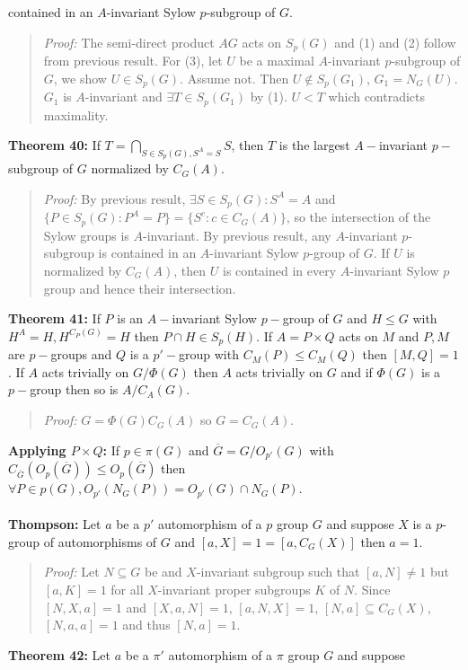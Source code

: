 contained in an $A$-invariant Sylow $p$-subgroup of $G$.
\begin{quote}
\emph{Proof:}  
The semi-direct product $AG$ acts on $S_p(G)$ and (1) and (2) follow from previous result.
For (3), let $U$ be a maximal $A$-invariant $p$-subgroup of $G$, we show $U \in S_p(G)$. 
Assume not.  Then $U \notin S_p(G_1)$, $G_1 = N_G(U)$.  $G_1$ is $A$-invariant and $\exists T \in S_p(G_1)$
by (1).  $U<T$ which contradicts maximality.
\end{quote}
{\bf Theorem 40:}
If $T=\bigcap_{S \in S_p(G), S^A=S} S$,
then $T$ is the largest $A-$invariant $p-$subgroup of $G$ normalized by $C_G(A)$.
\begin{quote}
\emph{Proof:}  
By previous result, $\exists S \in S_p(G): S^A=A$ and
$\{P \in S_p(G): P^A=P \} = \{S^c: c \in C_G(A) \}$, so the intersection of the Sylow groups is
$A$-invariant. By previous result, any $A$-invariant $p$-subgroup is contained in an $A$-invariant
Sylow $p$-group of $G$.  If $U$ is normalized by $C_G(A)$, then $U$ is contained in every $A$-invariant
Sylow $p$ group and hence their intersection.
\end{quote}
{\bf Theorem 41:}
If $P$ is an $A-$invariant Sylow $p-$group of $G$ and $H \le G$ with $H^A=H, H^{C_P(G)}=H$ then
$P \cap H \in S_p(H)$.  If $A= P \times Q$ acts on $M$ and $P, M$ are $p-$groups and
$Q$ is a $p'-$group with $C_M(P) \le C_M(Q)$ then $[M,Q]=1$. If $A$ acts trivially on
$G/\Phi(G)$ then $A$ acts trivially on $G$ and if $\Phi(G)$ is a $p-$group then
so is $A/C_A(G)$. 
\begin{quote}
\emph{Proof:}  
$G= \Phi(G) C_G(A)$ so $G= C_G(A)$.
\end{quote}
{\bf Applying $P \times Q$:} If $p \in \pi(G)$ and ${\overline G}= G/O_{p'}(G)$
with $C_{\overline G}(O_p({\overline G})) \le O_p({\overline G})$ then 
$\forall P \in p(G), O_{p'}(N_G(P))=O_{p'}(G) \cap N_G(P)$.
\\
\\
{\bf Thompson:} Let $a$ be a $p'$ automorphism of a $p$ group $G$ and suppose
$X$ is a $p$-group of automorphisms of $G$ and
$[a,X]=1=[a,C_G(X)]$ then $a=1$.
\begin{quote}
\emph{Proof:}  
Let $N \subseteq G$ be and $X$-invariant subgroup such that $[a,N] \ne 1$ but
$[a, K]= 1$ for all $X$-invariant proper subgroups $K$ of $N$.  Since
$[N,X,a]=1$ and $[X,a,N]=1$,  $[a, N, X] = 1$, $[N,a] \subseteq C_G(X)$,
$[N,a,a]= 1$ and thus $[N,a]= 1$.
\end{quote}
{\bf Theorem 42:} Let $a$ be a $\pi'$ automorphism of a $\pi$ group $G$ and suppose
